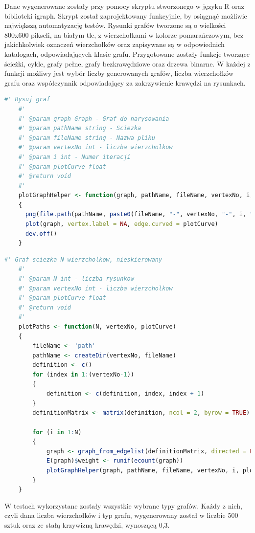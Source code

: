 Dane wygenerowane zostały przy pomocy skryptu stworzonego w języku R oraz biblioteki igraph.
Skrypt został zaprojektowany funkcyjnie, by osiągnąć możliwie największą automatyzację testów.
Rysunki grafów tworzone są o wielkości 800x600 pikseli, na białym tle, z wierzchołkami w kolorze pomarańczowym,
bez jakichkolwiek oznaczeń wierzchołków oraz zapisywane są w odpowiednich katalogach, odpowiadających klasie grafu.
Przygotowane zostały funkcje tworzące ścieżki, cykle, grafy pełne, grafy bezkrawędziowe oraz drzewa binarne.
W każdej z funkcji możliwy jest wybór liczby generowanych grafów, liczba wierzchołków grafu
oraz współczynnik odpowiadający za zakrzywienie krawędzi na rysunkach.

\begin{lstlisting}[language=R,caption=Listing skryptu rysującego grafy,label={tests-generation-1}]
	#' Rysuj graf
	#'
	#' @param graph Graph - Graf do narysowania
	#' @param pathName string - Sciezka
	#' @param fileName string - Nazwa pliku
	#' @param vertexNo int - liczba wierzcholkow
	#' @param i int - Numer iteracji
	#' @param plotCurve float
	#' @return void
	#'
	plotGraphHelper <- function(graph, pathName, fileName, vertexNo, i, plotCurve)
	{
	  png(file.path(pathName, paste0(fileName, "-", vertexNo, "-", i, ".png")), width = 800, height = 600)
	  plot(graph, vertex.label = NA, edge.curved = plotCurve)
	  dev.off()
	}
\end{lstlisting}

\begin{lstlisting}[language=R,caption=Listing funkcji tworzącej ścieżkę,label={tests-generation-2}]
	#' Graf sciezka N wierzcholkow, nieskierowany
	#'
	#' @param N int - liczba rysunkow
	#' @param vertexNo int - liczba wierzcholkow
	#' @param plotCurve float
	#' @return void
	#'
	plotPaths <- function(N, vertexNo, plotCurve)
	{
		fileName <- 'path'
		pathName <- createDir(vertexNo, fileName)
		definition <- c()
		for (index in 1:(vertexNo-1))
		{
			definition <- c(definition, index, index + 1)
		}
		definitionMatrix <- matrix(definition, ncol = 2, byrow = TRUE)
		
		for (i in 1:N)
		{
			graph <- graph_from_edgelist(definitionMatrix, directed = FALSE)
			E(graph)$weight <- runif(ecount(graph))
			plotGraphHelper(graph, pathName, fileName, vertexNo, i, plotCurve)
		}
	}
\end{lstlisting}

W testach wykorzystane zostały wszystkie wybrane typy grafów.
Każdy z nich, czyli dana liczba wierzchołków i typ grafu, wygenerowany został w liczbie 500 sztuk
oraz ze stałą krzywizną krawędzi, wynoszącą 0,3. %

